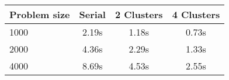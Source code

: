 \centering\begin{tabular}{l*{3}{c}}
\toprule
Problem size & Serial & 2 Clusters & 4 Clusters\\\midrule
1000 &   2.19s &   1.18s &   0.73s \\    
2000 &   4.36s &   2.29s &   1.33s \\    
4000 &   8.69s &   4.53s &   2.55s \\    
\bottomrule
\end{tabular}
